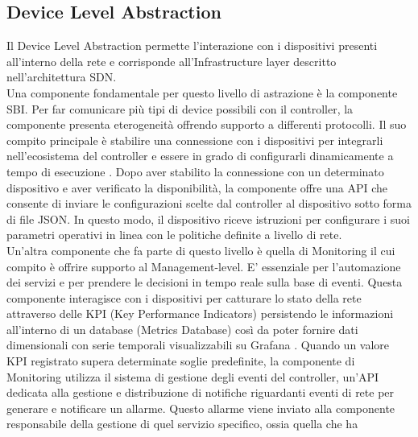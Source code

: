 \subsection{Device Level Abstraction}
Il Device Level Abstraction permette l'interazione con i dispositivi presenti all'interno della rete e corrisponde all'Infrastructure layer descritto nell'architettura SDN.
\\Una componente fondamentale per questo livello di astrazione è la componente SBI.
Per far comunicare più tipi di device possibili con il controller, la componente presenta eterogeneità offrendo supporto a differenti protocolli.
Il suo compito principale è stabilire una connessione con i dispositivi per integrarli nell'ecosistema del controller
e essere in grado di configurarli dinamicamente a tempo di esecuzione \cite{D32}. 
Dopo aver stabilito la connessione con un determinato dispositivo e aver verificato la disponibilità,
la componente offre una API che consente di inviare le configurazioni scelte dal controller al dispositivo sotto forma di file JSON.
In questo modo, il dispositivo riceve istruzioni per configurare i suoi parametri operativi in linea con le politiche definite a livello di rete. 
\\Un'altra componente che fa parte di questo livello è quella di Monitoring il cui compito è offrire supporto al Management-level.
E' essenziale per l'automazione dei servizi e per prendere le decisioni in tempo reale sulla base di eventi.
Questa componente interagisce con i dispositivi per catturare lo stato della rete attraverso delle KPI (Key Performance Indicators) persistendo le informazioni all'interno di un database (Metrics Database) così da poter fornire dati dimensionali 
con serie temporali visualizzabili su Grafana \cite{grafana}. %
Quando un valore KPI registrato supera determinate soglie predefinite, la componente di Monitoring utilizza il sistema di gestione degli eventi del controller, un'API dedicata alla gestione e distribuzione di notifiche riguardanti eventi di rete
per generare e notificare un allarme. Questo allarme viene inviato alla componente responsabile della gestione di quel servizio specifico, ossia quella che ha
